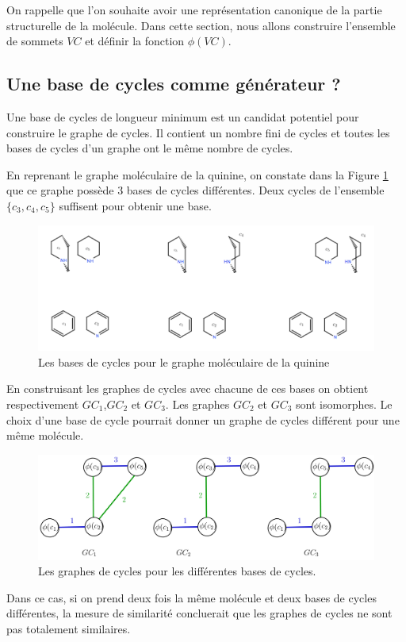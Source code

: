 On rappelle que l'on souhaite avoir une représentation canonique de la partie structurelle de la molécule. Dans cette section, nous allons construire l'ensemble de sommets $VC$ et définir la fonction $\phi(VC)$. 

\subsection{Une base de cycles comme générateur ?}


Une base de cycles de longueur minimum est un candidat potentiel pour construire le graphe de cycles. Il contient un nombre fini de cycles et toutes les bases de cycles d'un graphe ont le même nombre de cycles.

En reprenant le graphe moléculaire de la quinine, on constate dans la Figure \ref{lesbases} que ce graphe possède $3$ bases de cycles différentes. Deux cycles de l'ensemble $\{c_3, c_4, c_5\}$ suffisent pour obtenir une base.

\begin{figure}[H]
\label{lesbases}

\begin{center}
\includegraphics[scale=0.75]{base_complete.png}
\end{center}
\caption{Les bases de cycles pour le graphe moléculaire de la quinine}
\end{figure}

En construisant les graphes de cycles avec chacune de ces bases on obtient respectivement $GC_1$,$GC_2$ et $GC_3$. Les graphes $GC_2$ et $GC_3$ sont isomorphes. Le choix d'une base de cycle pourrait donner un graphe de cycles différent pour une même molécule.


\begin{figure}[H]
\label{bases}

\begin{center}
\includegraphics[scale=0.35]{graphes_base.png}
\end{center}

\caption{Les graphes de cycles pour les différentes bases de cycles.}
\end{figure}
Dans ce cas, si on prend deux fois la même molécule et deux bases de cycles différentes, la mesure de similarité concluerait que les graphes de cycles ne sont pas totalement similaires. 


